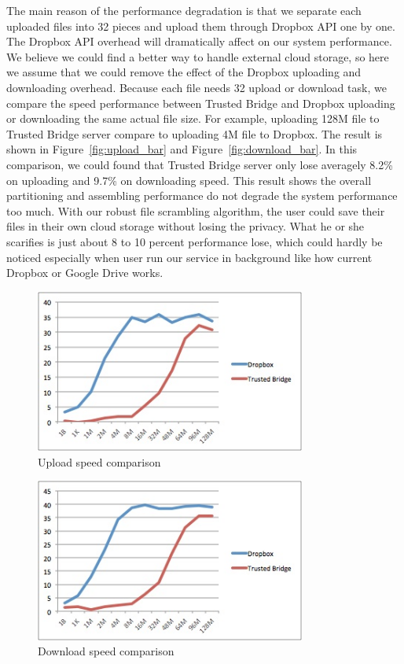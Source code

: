 The main reason of the performance degradation is that we separate each uploaded files into 32 pieces and upload them through Dropbox API one by one. The Dropbox API overhead will dramatically affect on our system performance. We believe we could find a better way to handle external cloud storage, so here we assume that we could remove the effect of the Dropbox uploading and downloading overhead. Because each file needs 32 upload or download task, we compare the speed performance between Trusted Bridge and Dropbox uploading or downloading the same actual file size. For example, uploading 128M file to Trusted Bridge server compare to uploading 4M file to Dropbox. The result is shown in Figure~\ref{fig:upload_bar} and Figure~\ref{fig:download_bar}. In this comparison, we could found that Trusted Bridge server only lose averagely 8.2\% on uploading and 9.7\% on downloading speed. This result shows the overall partitioning and assembling performance do not degrade the system performance too much. With our robust file scrambling algorithm, the user could save their files in their own cloud storage without losing the privacy. What he or she scarifies is just about 8 to 10 percent performance lose, which could hardly be noticed especially when user run our service in background like how current Dropbox or Google Drive works.


\begin{figure}[ht]
\centering
\includegraphics[width=3.5in]{pics/upload_line.png}
\caption{Upload speed comparison}
\label{fig:upload_line}
\end{figure}

\begin{figure}[ht]
\centering
\includegraphics[width=3.5in]{pics/download_line.png}
\caption{Download speed comparison}
\label{fig:download_line}
\end{figure}

